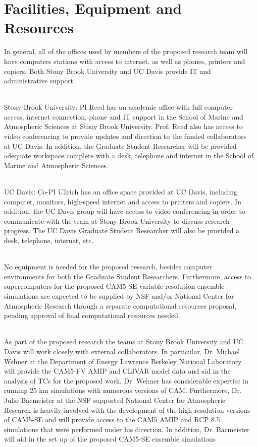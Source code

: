 \documentclass[11pt]{article}
\begin{document}
\setcounter{section}{2}

\appendix

\setcounter{section}{8}

\section{Facilities, Equipment and Resources}

In general, all of the offices used by members of the proposed research team will have computers stations with access to internet, as well as phones, printers and copiers. Both Stony Brook University and UC Davis provide IT and administrative support.

\ \\

\noindent Stony Brook University: PI Reed has an academic office with full computer access, internet connection, phone and IT support in the School of Marine and Atmospheric Sciences at Stony Brook University. Prof. Reed also has access to video conferencing to provide updates and direction to the funded collaborators at UC Davis. In addition, the Graduate Student Researcher will be provided adequate workspace complete with a desk, telephone and internet in the School of Marine and Atmospheric Sciences. 

\ \\

\noindent UC Davis: Co-PI Ullrich has an office space provided at UC Davis, including computer, monitors, high-speed internet and access to printers and copiers. In addition, the UC Davis group will have access to video conferencing in order to communicate with the team at Stony Brook University to discuss research progress.  The UC Davis Graduate Student Researcher will also be provided a desk, telephone, internet, etc.

\ \\

\noindent No equipment is needed for the proposed research, besides computer environments for both the Graduate Student Researchers. Furthermore, access to supercomputers for the proposed CAM5-SE variable-resolution ensemble simulations are expected to be supplied by NSF and/or National Center for Atmospheric Research through a separate computational resources proposal, pending approval of final computational resources needed.

\ \\

\noindent As part of the proposed research the teams at Stony Brook University and UC Davis will work closely with external collaborators.  In particular, Dr. Michael Wehner at the Department of Energy Lawrence Berkeley National Laboratory will provide the CAM5-FV AMIP and CLIVAR model data and aid in the analysis of TCs for the proposed work.  Dr. Wehner has considerable expertise in running 25 km simulations with numerous versions of CAM. Furthermore, Dr. Julio Bacmeister at the NSF supported National Center for Atmospheric Research is heavily involved with the development of the high-resolution versions of CAM5-SE and will provide access to the CAM5 AMIP and RCP 8.5 simulations that were performed under his direction.  In addition, Dr. Bacmeister will aid in the set up of the proposed CAM5-SE ensemble simulations
\end{document}
